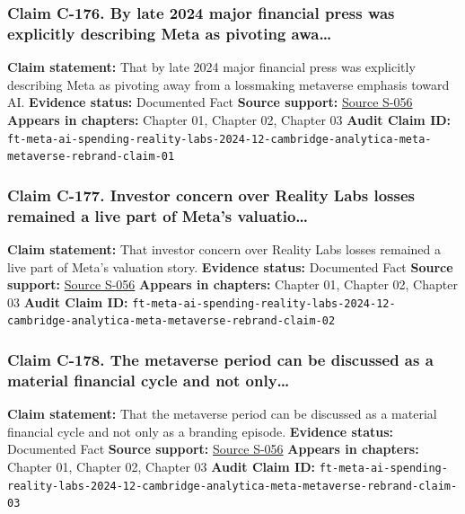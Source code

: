 \documentclass[
  american,
  11pt,
  letterpaper,
]{article}
\begin{document}
\subsubsection{Claim C-176. By late 2024 major financial press was
explicitly describing Meta as pivoting
awa\ldots{}}\label{claim-c-176-by-late-2024-major-financial-press-was-explicitly-describing-meta-as-pivoting-awa}

\textbf{Claim statement:} That by late 2024 major financial press was
explicitly describing Meta as pivoting away from a lossmaking metaverse
emphasis toward AI. \textbf{Evidence status:} Documented Fact
\textbf{Source support:}
\hyperref[source-s-056-meta-sees-ai-spending-accelerating-as-earnings-top-forecasts]{Source
S-056} \textbf{Appears in chapters:} Chapter 01, Chapter 02, Chapter 03
\textbf{Audit Claim ID:}
\texttt{ft-meta-ai-spending-reality-labs-2024-12-cambridge-analytica-meta-metaverse-rebrand-claim-01}

\subsubsection{Claim C-177. Investor concern over Reality Labs losses
remained a live part of Meta's
valuatio\ldots{}}\label{claim-c-177-investor-concern-over-reality-labs-losses-remained-a-live-part-of-meta-s-valuatio}

\textbf{Claim statement:} That investor concern over Reality Labs losses
remained a live part of Meta's valuation story. \textbf{Evidence
status:} Documented Fact \textbf{Source support:}
\hyperref[source-s-056-meta-sees-ai-spending-accelerating-as-earnings-top-forecasts]{Source
S-056} \textbf{Appears in chapters:} Chapter 01, Chapter 02, Chapter 03
\textbf{Audit Claim ID:}
\texttt{ft-meta-ai-spending-reality-labs-2024-12-cambridge-analytica-meta-metaverse-rebrand-claim-02}

\subsubsection{Claim C-178. The metaverse period can be discussed as a
material financial cycle and not
only\ldots{}}\label{claim-c-178-the-metaverse-period-can-be-discussed-as-a-material-financial-cycle-and-not-only}

\textbf{Claim statement:} That the metaverse period can be discussed as
a material financial cycle and not only as a branding episode.
\textbf{Evidence status:} Documented Fact \textbf{Source support:}
\hyperref[source-s-056-meta-sees-ai-spending-accelerating-as-earnings-top-forecasts]{Source
S-056} \textbf{Appears in chapters:} Chapter 01, Chapter 02, Chapter 03
\textbf{Audit Claim ID:}
\texttt{ft-meta-ai-spending-reality-labs-2024-12-cambridge-analytica-meta-metaverse-rebrand-claim-03}
\end{document}
